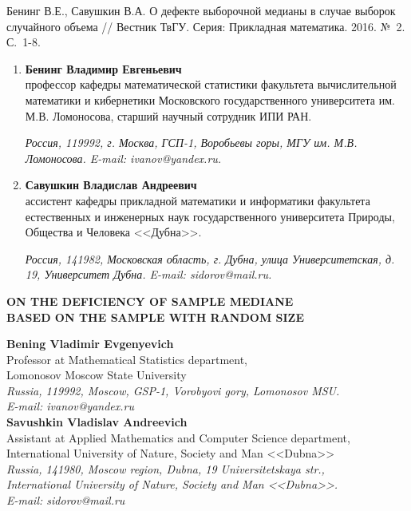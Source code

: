 \documentclass[a4paper,twoside]{article}
\theoremstyle{theorem}
\theoremstyle{remark}
\newcommand{\pages}{1-8}
\begin{document}
\bigskip{}\medskip
{Бенинг В.Е., Савушкин В.А. О дефекте выборочной медианы в случае выборок случайного объема // Вестник ТвГУ. Серия: Прикладная математика. 2016. №~2. С.~\pages.}

\bigskip{}
\begin{enumerate}[1.]
\item {\bf Бенинг Владимир Евгеньевич}\\
профессор кафедры математической статистики факультета вычислительной математики и кибернетики Московского 
государственного университета им. М.В. Ломоносова, старший научный сотрудник ИПИ РАН.

\vspace{1mm}
{\it Россия, 119992, г. Москва, ГСП-1, Воробьевы горы, МГУ им. М.В. Ломоносова. E-mail: ivanov@yandex.ru.} 
\item {\bf Савушкин Владислав Андреевич}\\
ассистент кафедры прикладной математики и информатики факультета естественных  и инженерных наук государственного университета Природы, Общества и Человека <<Дубна>>.

\vspace{1mm}
{\it Россия, 141982, Московская область, г. Дубна, улица Университетская, д. 19, Университет Дубна. E-mail: sidorov@mail.ru.} 
\end{enumerate} 

\newpage
\thispagestyle{plain}
\begin{center}
{\bf ON THE DEFICIENCY OF SAMPLE MEDIANE\\ BASED ON THE SAMPLE WITH RANDOM SIZE}
\vspace{4mm}\par
{\bf Bening Vladimir Evgenyevich}\\
Professor at Mathematical Statistics department,\\ Lomonosov Moscow State University\\
{\it Russia, 119992, Moscow, GSP-1, Vorobyovi gory, Lomonosov MSU.\\ E-mail: ivanov@yandex.ru}\\ \vspace{2mm}
{\bf Savushkin Vladislav Andreevich}\\
Assistant at Applied Mathematics and Computer Science department,\\ International University of Nature, Society and Man <<Dubna>>\\
{\it Russia, 141980, Moscow region, Dubna, 19 Universitetskaya str.,\\ International University of Nature, Society and Man <<Dubna>>.\\ E-mail: sidorov@mail.ru}  
\end{center}
\vspace{2mm}\par
\end{document}
